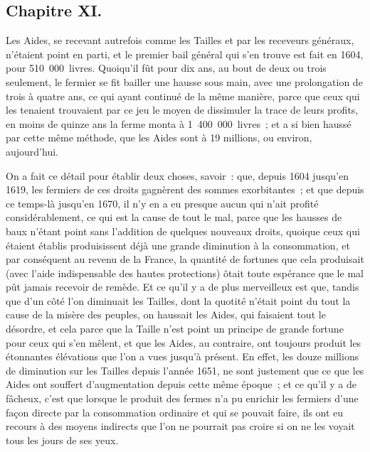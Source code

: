 \documentclass[french,twoside]{book} %
\begin{document}
\subsection[{Chapitre XI.}]{Chapitre XI.}
\noindent Les Aides, se recevant autrefois comme les Tailles et par les receveurs généraux, n’étaient point en parti, et le premier bail général qui s’en trouve est fait en 1604, pour 510 000 livres. Quoiqu’il fût pour dix ans, au bout de deux ou trois seulement, le fermier se fit bailler une hausse sous main, avec une prolongation de trois à quatre ans, ce qui ayant continué de la même manière, parce que ceux qui les tenaient trouvaient par ce jeu le moyen de dissimuler la trace de leurs profits, en moins de quinze ans la ferme monta à 1 400 000 livres ; et a si bien haussé par cette même méthode, que les Aides sont à 19 millions, ou environ, aujourd’hui.\par
On a fait ce détail pour établir deux choses, savoir : que, depuis 1604 jusqu’en 1619, les fermiers de ces droits gagnèrent des sommes exorbitantes ; et que depuis ce temps-là jusqu’en 1670, il n’y en a eu presque aucun qui n’ait profité considérablement, ce qui est la cause de tout le mal, parce que les hausses de baux n’étant point sans l’addition de quelques nouveaux droits, quoique ceux qui étaient établis produisissent déjà une grande diminution à la consommation, et par conséquent au revenu de la France, la quantité de fortunes que cela produisait (avec l’aide indispensable des hautes protections) ôtait toute espérance que le mal pût jamais recevoir de remède. Et ce qu’il y a de plus merveilleux est que, tandis que d’un côté l’on diminuait les Tailles, dont la quotité n’était point du tout la cause de la misère des peuples, on haussait les Aides, qui faisaient tout le désordre, et cela parce que la Taille n’est point un principe de grande fortune pour ceux qui s’en mêlent, et que les Aides, au contraire, ont toujours produit les étonnantes élévations que l’on a vues jusqu’à présent. En effet, les douze millions de diminution sur les Tailles depuis l’année 1651, ne sont justement que ce que les Aides ont souffert d’augmentation depuis cette même époque ; et ce qu’il y a de fâcheux, c’est que lorsque le produit des fermes n’a pu enrichir les fermiers d’une façon directe par la consommation ordinaire et qui se pouvait faire, ils ont eu recours à des moyens indirects que l’on ne pourrait pas croire si on ne les voyait tous les jours de ses yeux.
\end{document}
